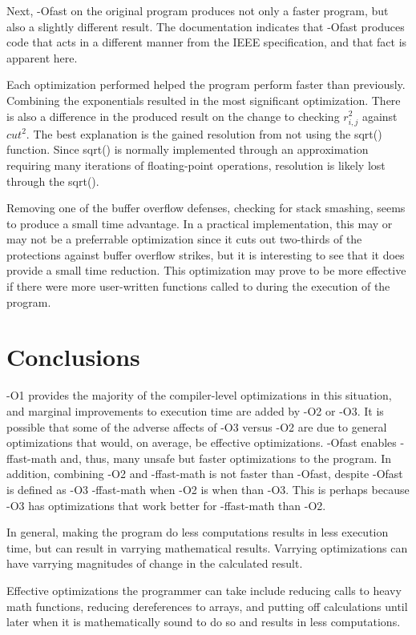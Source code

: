 \documentclass[12pt]{article}
\begin{document}
	Next, -Ofast on the original program produces not only a faster program, but also a slightly different result.
	The documentation indicates that -Ofast produces code that acts in a different manner from the IEEE specification, and that fact is apparent here.

	Each optimization performed helped the program perform faster than previously. Combining the exponentials resulted in the most significant optimization.
	There is also a difference in the produced result on the change to checking $r_{i,j}^2$ against $cut^2$.
	The best explanation is the gained resolution from not using the sqrt() function.
	Since sqrt() is normally implemented through an approximation requiring many iterations of floating-point operations,
	resolution is likely lost through the sqrt().

	Removing one of the buffer overflow defenses, checking for stack smashing, seems to produce a small time advantage.
	In a practical implementation, this may or may not be a preferrable optimization 
	since it cuts out two-thirds of the protections against buffer overflow strikes, but it is interesting to see that it does provide a small time reduction.
	This optimization may prove to be more effective if there were more user-written functions called to during the execution of the program.

	\section{Conclusions}

	-O1 provides the majority of the compiler-level optimizations in this situation, and marginal improvements to execution time are added by -O2 or -O3.
	It is possible that some of the adverse affects of -O3 versus -O2 are due to general optimizations that would, on average, be effective optimizations.
	-Ofast enables -ffast-math and, thus, many unsafe but faster optimizations to the program.
	In addition, combining -O2 and -ffast-math is not faster than -Ofast, despite -Ofast is defined as -O3 -ffast-math when -O2 is when than -O3.
	This is perhaps because -O3 has optimizations that work better for -ffast-math than -O2.

	In general, making the program do less computations results in less execution time, but can result in varrying mathematical results.
	Varrying optimizations can have varrying magnitudes of change in the calculated result.

	Effective optimizations the programmer can take include reducing calls to heavy math functions, reducing dereferences to arrays, and putting off calculations until later when it is mathematically sound to do so and results in less computations.
\end{document}
